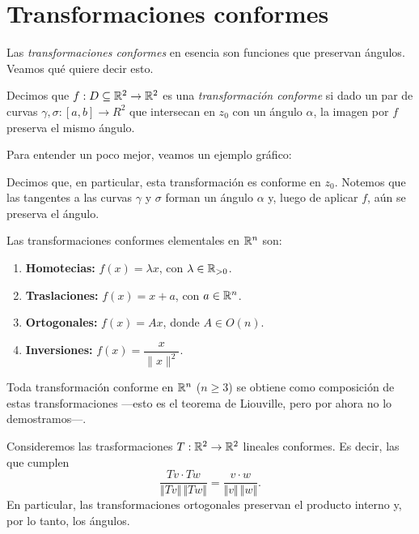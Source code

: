 \section{Transformaciones conformes}

Las \textit{transformaciones conformes} en esencia son funciones que preservan ángulos. Veamos qué quiere decir esto.

\begin{definition}
    Decimos que $f: D \subseteq \mathbb{R}^2 \to \mathbb{R}^2$ es una \emph{transformación conforme} si dado un par de curvas $\gamma, \sigma : [a, b] \to R^2$ que intersecan en $z_0$ con un ángulo $\alpha$, la imagen por $f$ preserva el mismo ángulo.
\end{definition}

Para entender un poco mejor, veamos un ejemplo gráfico:



Decimos que, en particular, esta transformación es conforme en $z_0$. Notemos que las tangentes a las curvas $\gamma$ y $\sigma$ forman un ángulo $\alpha$ y, luego de aplicar $f$, aún se preserva el ángulo.

Las transformaciones conformes elementales en $\mathbb{R}^n$ son:
\begin{enumerate}
    \item \textbf{Homotecias:} $f(x) = \lambda x$, con $\lambda \in \mathbb{R}_{>0}$.
    \item \textbf{Traslaciones:} $f(x) = x + a$, con $a \in \mathbb{R}^n$.
    \item \textbf{Ortogonales:} $f(x) = A x$, donde $A \in O(n)$.
    \item \textbf{Inversiones:} $f(x) = \dfrac{x}{\|x\|^2}$.
\end{enumerate}


Toda transformación conforme en $\mathbb{R}^n$ ($n \geq 3$) se obtiene como composición de estas transformaciones ---esto es el teorema de Liouville, pero por ahora no lo demostramos---.

\bigskip

Consideremos las trasformaciones $T: \mathbb{R}^2 \to \mathbb{R}^2$ lineales conformes. Es decir, las que cumplen
\begin{equation*}
    \frac{Tv \cdot Tw}{\Vert Tv \Vert \, \Vert Tw \Vert} = \frac{v \cdot w}{\Vert v \Vert \, \Vert w \Vert}.
\end{equation*}
En particular, las transformaciones ortogonales preservan el producto interno y, por lo tanto, los ángulos.

